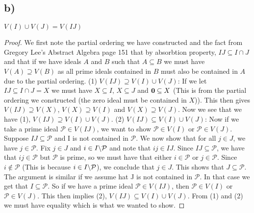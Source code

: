 \documentclass{article}
\theoremstyle{definition}
\begin{document}
\subsection*{b)}
$V(I)\cup V(J)=V(IJ)$
\begin{proof}
We first note the partial ordering we have constructed and the fact from Gregory Lee's Abstract Algebra page 151 that by absorbtion property, $IJ\subseteq I\cap J$ and that if we have ideals $A$ and $B$ such that $A\subseteq B$ we must have $V(A)\supseteq V(B)$ as all prime ideals contained in $B$ must also be contained in $A$ due to the partial ordering.
\newline\newline
(1) $V(IJ)\supseteq V(I)\cup V(J)$:
\newline
If we let $IJ\subseteq I\cap J=X$ we must have $X\subseteq I$, $X\subseteq J$ and $\bold{0}\subseteq X$ (This is from the partial ordering we constructed (the zero ideal must be contained in $X$)). This then gives $V(IJ)\supseteq V(X)$, $V(X)\supseteq V(I)$ and $V(X)\supseteq V(J)$. Now we see that we have (1), $V(IJ)\supseteq V(I)\cup V(J)$.
\newline\newline
(2) $V(IJ)\subseteq V(I)\cup V(J)$:
\newline
Now if we take a prime ideal $\mathcal{P}\in V(IJ)$, we want to show $\mathcal{P}\in V(I)$ or $\mathcal{P}\in V(J)$. Suppose $IJ\subseteq\mathcal{P}$ and I is not contained in $\mathcal{P}$. We now show that for all $j\in J$, we have $j\in \mathcal{P}$. Fix $j\in J$ and $i\in I\symbol{92}\mathcal{P}$ and note that $ij\in IJ$. Since $IJ\subseteq \mathcal{P}$, we have that $ij\in\mathcal{P}$ but $\mathcal{P}$ is prime, so we must have that either $i\in\mathcal{P}$ or $j\in\mathcal{P}$. Since $i\notin\mathcal{P}$ (This is because $i\in I\symbol{92}\mathcal{P}$), we conclude that $j\in J$. This shows that $J\subseteq \mathcal{P}$. The argument is similar if we assume hat J is not contained in $\mathcal{P}$. In that case we get that $I\subseteq\mathcal{P}$. So if we have a prime ideal $\mathcal{P}\in V(IJ)$, then $\mathcal{P}\in V(I)$ or $\mathcal{P}\in V(J)$. This then implies (2), $V(IJ)\subseteq V(I)\cup V(J)$.
\newline\newline
From (1) and (2) we must have equality which is what we wanted to show.
\end{proof}
\end{document}
